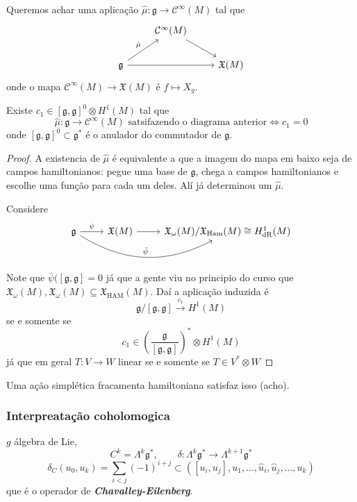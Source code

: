 Queremos achar uma aplicação $\hat{\mu}:\mathfrak{g} \to \mathcal{C}^\infty(M)$ tal que
\[\begin{tikzcd}
&\mathcal{C}^\infty(M)\arrow[dr]\\
\mathfrak{g}\arrow[rr,""]\arrow[ur,"\hat{\mu}"]&&\mathfrak{X}(M)
\end{tikzcd}\]
onde o mapa $\mathcal{C}^\infty(M)\to  \mathfrak{X}(M)$ é $f\mapsto X_g$.
\begin{prop}\leavevmode
	Existe $c_1 \in [\mathfrak{g},\mathfrak{g} ]^0\otimes H^{1}(M)$ tal que 
	\[\hat{\mu}:\mathfrak{g} \to \mathcal{C}^\infty(M)\text{ satsifazendo o diagrama anterior} \iff c_1=0 \]
	onde $[\mathfrak{g},\mathfrak{g} ]^0\subset \mathfrak{g}^*$ é o anulador do commutador de $\mathfrak{g} $.
\begin{proof}\leavevmode
	A existencia de $\hat{\mu}$ é equivalente a que a imagem do mapa em baixo seja de campos hamiltonianos: pegue uma base de $\mathfrak{g}$, chega a campos hamiltonianos e escolhe uma função para cada um deles. Alí já determinou um $\hat{\mu}$.

	Considere
\[\begin{tikzcd}
	\mathfrak{g} \arrow[rr,bend right,"\bar{\psi}" ]\arrow[r,"\psi"]&\mathfrak{X}(M)\arrow[r]&\mathfrak{X}_\omega(M)/\mathfrak{X}_{\operatorname{Ha m}}(M)\cong H^{1}_{\operatorname{dR}}(M)
\end{tikzcd}\]
Note que $\bar{\psi}([\mathfrak{g},\mathfrak{g} ] =0$ já que a gente viu no principio do curso que $\mathfrak{X}_\omega(M),\mathfrak{X}_\omega(M)\subseteq \mathfrak{X}_{\operatorname{HAM}}(M)$. Daí a aplicação induzida é
\[\mathfrak{g} /[\mathfrak{g},\mathfrak{g} ]\overset{c_1}{\longrightarrow}H^{1}(M)\]
se e somente se
\[c_1\in\left( \frac{\mathfrak{g}}{[\mathfrak{g},\mathfrak{g} ]} \right)^*\otimes H^{1}(M) \]
já que em geral $T:V\to W$ linear se e somente se $T\in V^*\otimes W$
\end{proof}
\end{prop}

\begin{remark}\leavevmode
	 Uma ação simplética fracamenta hamiltoniana satisfaz isso (acho).
\end{remark}

\subsubsection{Interpreatação coholomogica}
$g$ álgebra de Lie,
\[C^k=\Lambda^k\mathfrak{g}^*,\qquad \delta:\Lambda^k\mathfrak{g}^*\to \Lambda^{k+1}\mathfrak{g}^*\]
\[\delta_C(u_0,u_k)= \sum_{i<j}(-1)^{i+j}\subset([u_i,u_j],u_1,\ldots,\hat{u}_i,\hat{u}_j,\ldots,u_k)\]
que é o operador de \textit{\textbf{Chavalley-Eilenberg}}.

